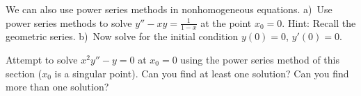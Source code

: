 \documentclass[12pt]{book}
\begin{document}
\begin{exercise}[challenging]
We can also use power series methods in nonhomogeneous equations.
a)~Use power series methods to solve $y'' - x y = \frac{1}{1-x}$
at the point $x_0 = 0$. Hint: Recall the geometric series.
b)~Now solve for the initial condition $y(0)=0$, $y'(0) = 0$.
\end{exercise}

\begin{exercise}
Attempt to solve $x^2 y'' - y = 0$ at $x_0 = 0$ using the power series
method of this section ($x_0$ is a singular point).
Can you find at least one solution?  Can you find more than one solution?
\end{exercise}
\end{document}

